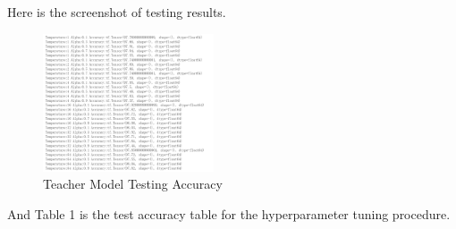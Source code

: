 \documentclass[conference]{IEEEtran}
\begin{document}
Here is the screenshot of testing results.
\begin{figure}[h] 
    \centering
    \includegraphics[width=0.45\textwidth]{./graphs/student_accuracy_mnist.png}
    \caption{Teacher Model Testing Accuracy}
    \label{Fig.t1q3e}
\end{figure}\par
And Table 1 is the test accuracy table for the hyperparameter tuning procedure.\par
\end{document}
